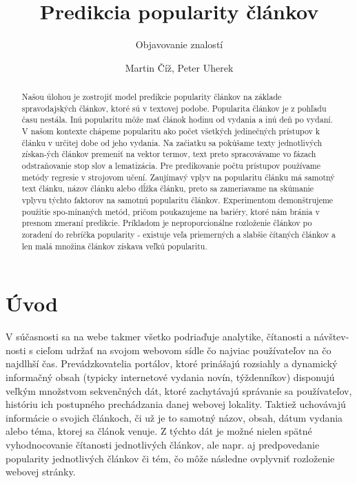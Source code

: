\documentclass[runningheads,a4paper]{llncs}
\begin{document}
\title{Predikcia popularity článkov}
\subtitle{Objavovanie znalostí}
\author{Martin Číž, Peter Uherek}
\maketitle

\begin{abstract}
  Našou úlohou je zostrojiť model predikcie popularity článkov na základe spravodajských článkov, ktoré sú v textovej podobe.
  Popularita článkov je z pohľadu času nestála. Inú popularitu môže mať článok hodinu od vydania a inú deň po vydaní.
  V našom kontexte chápeme popularitu ako počet všetkých jedinečných prístupov k článku v určitej dobe od jeho vydania.
  Na začiatku sa pokúšame texty jednotlivých získan-ých článkov premeniť na vektor termov, text preto spracovávame vo fázach odstraňovanie stop slov a lematizácia.
  Pre predikovanie počtu prístupov používame metódy regresie v strojovom učení.
  Zaujímavý vplyv na popularitu článku má samotný text článku, názov článku alebo dĺžka článku, preto sa zameriavame na skúmanie vplyvu týchto faktorov na samotnú popularitu článkov.
  Experimentom demonštrujeme použitie spo-mínaných metód, pričom poukazujeme na bariéry, ktoré nám bránia v presnom zmeraní predikcie.
  Príkladom je neproporcionálne rozloženie článkov po zoradení do rebríčka popularity - existuje veľa priemerných a slabšie čítaných článkov a len malá množina článkov získava veľkú popularitu.
\end{abstract}

\section{Úvod}
  V súčasnosti sa na webe takmer všetko podriaďuje analytike, čítanosti a 
návštev-nosti s cieľom udržať na svojom webovom sídle čo najviac používateľov na 
čo najdlhší čas. Prevádzkovatelia portálov, ktoré prinášajú rozsiahly a 
dynamický informačný obsah (typicky internetové vydania novín, týždenníkov) 
disponujú veľkým množstvom sekvenčných dát, ktoré zachytávajú správanie sa 
používateľov, históriu ich postupného prechádzania danej webovej lokality. 
Taktiež uchovávajú informácie o svojich článkoch, či už je to samotný názov, 
obsah, dátum vydania alebo téma, ktorej sa článok venuje. Z týchto dát je možné 
nielen spätné vyhodnocovanie čítanosti jednotlivých článkov, ale napr. aj 
predpovedanie popularity jednotlivých článkov či tém, čo môže následne ovplyvniť 
rozloženie webovej stránky. 
\end{document}
